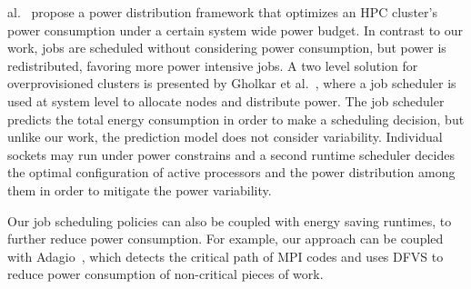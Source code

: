 al.~\cite{Ellsworth:2015:DPS:2807591.2807643} propose a power distribution framework that
optimizes an HPC cluster's power consumption under a certain system wide power budget.  In
contrast to our work, jobs are scheduled without considering power consumption, but power
is redistributed, favoring more power intensive jobs.  A two level solution for
overprovisioned clusters is presented by Gholkar et
al.~\cite{Gholkar:2016:PTH:2967938.2967961}, where a job scheduler is used at system level
to allocate nodes and distribute power.  The job scheduler predicts the total energy
consumption in order to make a scheduling decision, but unlike our work, the prediction
model does not consider variability.  Individual sockets may run under power constrains
and a second runtime scheduler decides the optimal configuration of active
processors and the power distribution among them in order to mitigate the power
variability.
\par
Our job scheduling policies can also be coupled with energy saving runtimes, to further
reduce power consumption.  
For example, our approach can be coupled with
Adagio~\cite{rountree2009}, which detects the
critical path of MPI codes and uses DFVS to reduce power consumption of
non-critical pieces of work.

